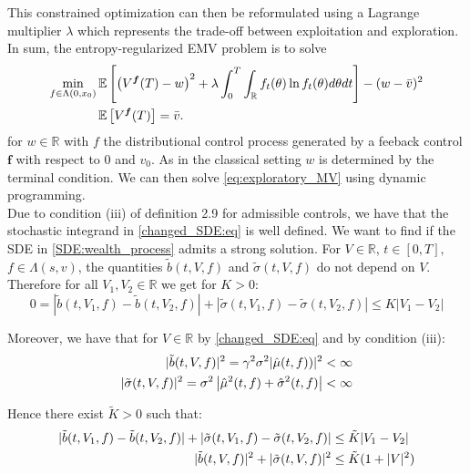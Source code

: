 \documentclass[oneside, a4paper, onecolumn, 11pt]{article}
\begin{document}
This constrained optimization can then be reformulated using a Lagrange multiplier $\lambda$ which represents the trade-off between exploitation and exploration.
In sum, the entropy-regularized EMV problem is to solve 
\begin{equation}
\begin{aligned}
\min_{f \in \Lambda(0, x_0)} \mathbb{E}&\left[ \left( V^{\boldsymbol{f}}(T) - w \right)^2 + \lambda \int_{0}^{T} \int_{\mathbb{R}} f_t(\theta)\ln{f_t}(\theta)d\theta dt \right] - (w-\Bar{v})^2 \\
\mathbb{E}&\left[V^{\boldsymbol{f}}(T)\right]= \Bar{v}.
\end{aligned}
\label{eq:exploratory_MV}
\end{equation}
for $w \in \mathbb{R}$ with $f$ the distributional control process generated by a feeback control $\boldsymbol{f}$ with respect to 0 and $v_0$. As in the classical setting $w$ is determined by the terminal condition. 
We can then solve \eqref{eq:exploratory_MV} using dynamic programming. \\ 
Due to condition (iii) of definition 2.9 for admissible controls, we have that the stochastic integrand in \eqref{changed_SDE:eq} is well defined. We  want to find if the SDE in \eqref{SDE:wealth_process} admits a strong solution. For $ V\in \mathbb{R}$, $t \in [0,T],$  $f \in \Lambda(s,v)$, the quantities $\tilde{b}(t,V,f)$  and $\tilde{\sigma}(t,V,f)$ do not depend on $V$. Therefore for all $V_1, V_2\in \mathbb{R}$ we get for $K>0$: 
\begin{equation}
0 =|\tilde{b}(t,V_1,f) - \tilde{b}(t,V_2,f)| + \left|\tilde{\sigma}(t,V_1,f) - \tilde{\sigma}(t,V_2,f)\right| \leq K |V_1 - V_2|
\end{equation}

Moreover, we have that for $V \in \mathbb{R}$ by \eqref{changed_SDE:eq} and by condition (iii):
\begin{align*}
 | \Tilde{b}(t, V, f) |^2 = \gamma^2\sigma^2 |\hat{\mu}(t,f))|^2 &< \infty\\ 
 | \Tilde{\sigma}(t, V, f) |^2  = \sigma^2 \left|\hat{\mu}^2(t,f) + \hat{\sigma}^2(t,f)\right| &< \infty  
\end{align*}

Hence there exist $\tilde{K}>0$ such that: 
\begin{align}
    |\tilde{b}(t,V_1,f) - \tilde{b}(t,V_2,f)| + \left|\tilde{\sigma}(t,V_1,f) - \tilde{\sigma}(t,V_2,f)\right| &\leq \tilde{K} |V_1 - V_2|\\
    | \Tilde{b}(t, V, f) |^2 +  | \Tilde{\sigma}(t, V, f) |^2  &\leq  \tilde{K}(1+ |V|^2)
\end{align}
\end{document}
